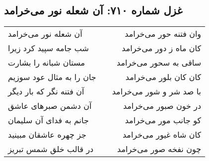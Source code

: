 \begin{center}
\section*{غزل شماره ۷۱۰: آن شعله نور می‌خرامد}
\label{sec:0710}
\begin{longtable}{l p{0.5cm} r}
آن شعله نور می‌خرامد
&&
وان فتنه حور می‌خرامد
\\
شب جامه سپید کرد زیرا
&&
کان ماه ز دور می‌خرامد
\\
مستان شبانه را بشارت
&&
ساقی به سحور می‌خرامد
\\
جان را به مثال عود سوزیم
&&
کان کان بلور می‌خرامد
\\
آن فتنه نگر که بار دیگر
&&
با صد شر و شور می‌خرامد
\\
آن دشمن صبرهای عاشق
&&
در خون صبور می‌خرامد
\\
جانم به فدای آن سلیمان
&&
کو جانب مور می‌خرامد
\\
جز چهره عاشقان مبینید
&&
کان شاه غیور می‌خرامد
\\
در قالب خلق شمس تبریز
&&
چون نفخه صور می‌خرامد
\\
\end{longtable}
\end{center}
